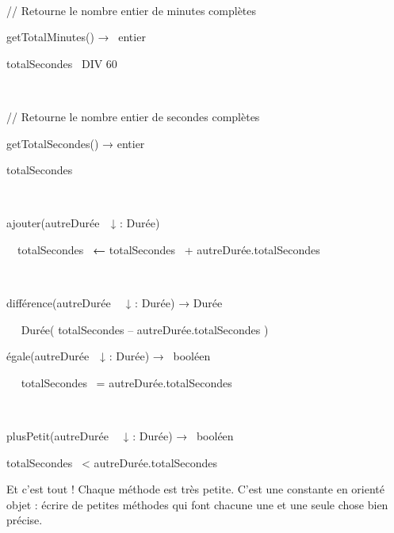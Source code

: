 {\sffamily
{}}

{\sffamily
~}

{\sffamily
// Retourne le nombre entier de minutes complètes}

{\sffamily
{} getTotalMinutes() → \ entier}

{\sffamily
{} totalSecondes~ DIV 60 }

{\sffamily
{}}

{\sffamily
~}

{\sffamily
// Retourne le nombre entier de secondes complètes}

{\sffamily
{} getTotalSecondes() →\textrm{  }entier}

{\sffamily
{} totalSecondes~}

{\sffamily
{}}

{\sffamily
~}

{\sffamily
{} ajouter(autreDurée~~↓ : Durée)}

{\sffamily
\ \ totalSecondes~ \textbf{←} totalSecondes~ + autreDurée.totalSecondes}

{\sffamily
{}}

{\sffamily
~}

{\sffamily
{} différence(autreDurée~~ ↓ : Durée) → Durée}

{\sffamily
\ \   Durée(
{\textbar} totalSecondes – autreDurée.totalSecondes {\textbar} )}

{\sffamily
{}}


\bigskip

{\sffamily
{} égale(autreDurée~~↓ : Durée) → \ booléen}

{\sffamily
\ \  totalSecondes~ =
autreDurée.totalSecondes~}

{\sffamily
{}}

{\sffamily
~}

{\sffamily
{} plusPetit(autreDurée~~ ↓ : Durée) → \ booléen}

{\sffamily
{} totalSecondes~ {\textless}
autreDurée.totalSecondes}

{\sffamily
{}}

{
Et c’est tout ! Chaque méthode est très petite. C’est une constante en
orienté objet : écrire de petites méthodes qui font chacune une et une
seule chose bien précise.}

